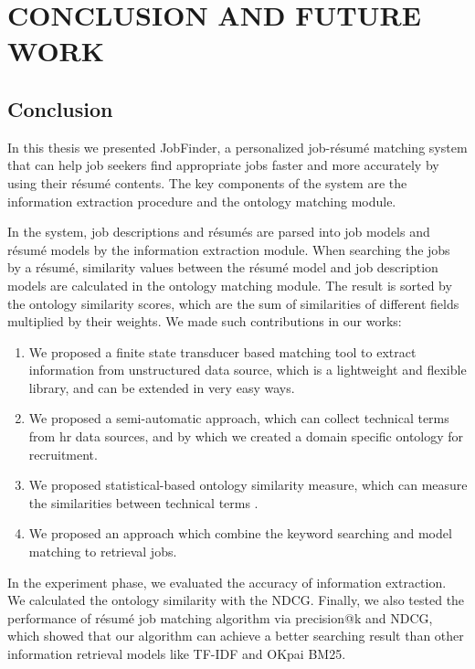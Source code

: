 \chapter{CONCLUSION AND FUTURE WORK}

\section{Conclusion}
In this thesis we presented JobFinder, a personalized job-r\'esum\'e matching system that can help job seekers find appropriate jobs faster and more accurately by using their r\'esum\'e contents. The key components of the system are the information extraction procedure and the ontology matching module.

In the system, job descriptions and r\'esum\'es are parsed into job models and r\'esum\'e models by the information extraction module. When searching the jobs by a r\'esum\'e, similarity values between the r\'esum\'e model and job description models are calculated in the ontology matching module. The result is sorted by the ontology similarity scores, which are the sum of similarities of different fields multiplied by their weights.
We made such contributions in our works:

\begin{enumerate}
    \item  We proposed a finite state transducer based matching tool to extract information from unstructured data source, which is a lightweight and flexible library, and can be extended in very easy ways.
    \item  We proposed a semi-automatic approach, which can collect technical terms from hr data sources, and by which we created a domain specific ontology for recruitment.
    \item  We proposed statistical-based ontology similarity measure, which can measure the similarities between technical terms .
    \item  We proposed an approach which combine the keyword searching and model matching to retrieval jobs.
\end{enumerate}

In the experiment phase, we evaluated the accuracy of information extraction. We calculated the ontology similarity with the NDCG. Finally, we also tested the performance of r\'esum\'e job matching algorithm via precision@k and NDCG, which showed that our algorithm can achieve a better searching result than other information retrieval models like TF-IDF and OKpai BM25.


